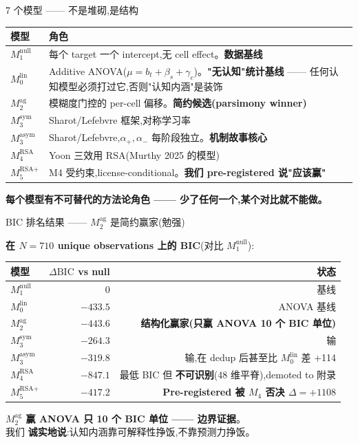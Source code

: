 \documentclass[aspectratio=169,11pt]{ctexbeamer}
\newcommand{\hi}[1]{\textcolor{ow-red}{\textbf{#1}}}
\newcommand{\hib}[1]{\textcolor{ow-blue}{\textbf{#1}}}
\newcommand{\target}{t}
\begin{document}
\begin{frame}{7 个模型 —— 不是堆砌,是结构}

\small
\begin{tabular}{p{3cm}p{8.5cm}}
\toprule
模型 & 角色 \\
\midrule
$M_1^\text{null}$ & 每个 target 一个 intercept,无 cell effect。\hib{数据基线} \\
$M_0^\text{lin}$ & Additive ANOVA($\mu = b_\target + \beta_s + \gamma_c$)。\hib{"无认知"统计基线} —— 任何认知模型必须打过它,否则"认知内涵"是装饰 \\
$M_2^\text{ag}$ & 模糊度门控的 per-cell 偏移。\hib{简约候选(parsimony winner)} \\
$M_3^\text{sym}$ & Sharot/Lefebvre 框架,对称学习率 \\
$M_3^\text{asym}$ & Sharot/Lefebvre,$\alpha_+, \alpha_-$ 每阶段独立。\hib{机制故事核心} \\
$M_4^\text{RSA}$ & Yoon 三效用 RSA(Murthy 2025 的模型) \\
$M_5^\text{RSA+}$ & M4 受约束,license-conditional。\hib{我们 pre-registered 说"应该赢"} \\
\bottomrule
\end{tabular}

\bigskip
\hib{每个模型有不可替代的方法论角色 —— 少了任何一个,某个对比就不能做。}
\end{frame}

\begin{frame}{BIC 排名结果 —— $M_2^\text{ag}$ 是简约赢家(勉强)}

\textbf{在 $N=710$ unique observations 上的 BIC}(对比 $M_1^\text{null}$):

\begin{center}\small
\begin{tabular}{lrr}
\toprule
模型 & $\Delta\text{BIC}$ vs null & 状态 \\
\midrule
$M_1^\text{null}$ & $0$ & 基线 \\
$M_0^\text{lin}$ & $-433.5$ & ANOVA 基线 \\
\hi{$M_2^\text{ag}$} & \hi{$-443.6$} & \hi{结构化赢家(只赢 ANOVA 10 个 BIC 单位)} \\
$M_3^\text{sym}$ & $-264.3$ & 输 \\
$M_3^\text{asym}$ & $-319.8$ & 输,在 dedup 后甚至比 $M_0^\text{lin}$ 差 +114 \\
$M_4^\text{RSA}$ & $-847.1$ & 最低 BIC 但 \hib{不可识别}(48 维平脊),demoted to 附录 \\
$M_5^\text{RSA+}$ & $-417.2$ & \hib{Pre-registered 被 $M_4$ 否决 $\Delta=+1108$} \\
\bottomrule
\end{tabular}
\end{center}

\bigskip
\hi{$M_2^\text{ag}$ 赢 ANOVA 只 10 个 BIC 单位 —— 边界证据}。\\
我们 \hib{诚实地说}:认知内涵靠可解释性挣饭,不靠预测力挣饭。
\end{frame}
\end{document}
